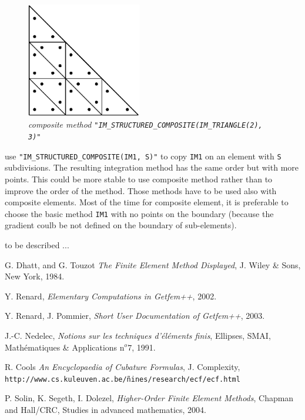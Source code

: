 \documentclass[11pt,a4paper]{article}
\begin{document}
\begin{figure}[H]
  \begin{center}
    \includegraphics[width=5cm,angle=0]{getfemlist_intmethod_triangle2_comp.eps}
  \end{center}
  \caption{ \it composite method {\tt "IM\_STRUCTURED\_COMPOSITE(IM\_TRIANGLE(2), 3)"}} 
  \label{fig:triangle_comp}
\end{figure}


use {\tt "IM\_STRUCTURED\_COMPOSITE(IM1, S)"} to copy {\tt IM1} on an element with {\tt S} subdivisions. The resulting integration method has the same order but with more points. This could be more stable to use composite method rather than to improve the order of the method. Those methods have to be used also with composite elements. Most of the time for composite element, it is preferable to choose the basic method {\tt IM1} with no points on the boundary (because the gradient coulb be not defined on the boundary of sub-elements). 

to be described ...

\begin{thebibliography}{99}
% 
% 
% 
  G. {\sc Dhatt, and  G. Touzot}
  {\it The Finite Element Method Displayed}, 
 J. Wiley \& Sons,  New York, 1984.

  Y. {\sc Renard},
  {\it Elementary Computations in {\sc Getfem++}}, 2002.

  Y. {\sc Renard}, J. {\sc Pommier},
  {\it Short User Documentation of {\sc Getfem++}}, 2003.

  J.-C. {\sc Nedelec},
  {\it Notions sur les techniques d'{\'e}l{\'e}ments finis}, Ellipses, SMAI, Math{\'e}matiques \& Applications n$^o7$, 1991.

  R. {\sc Cools}
  {\it An Encyclopaedia of Cubature Formulas}, J. Complexity, {\tt http://www.cs.kuleuven.ac.be/{\~n}ines/research/ecf/ecf.html}

  P. {\sc Solin, K. Segeth, I. Dolezel},
  {\it Higher-Order Finite Element Methods}, Chapman and Hall/CRC, Studies in advanced mathematics, 2004.


\end{thebibliography}
\end{document}
